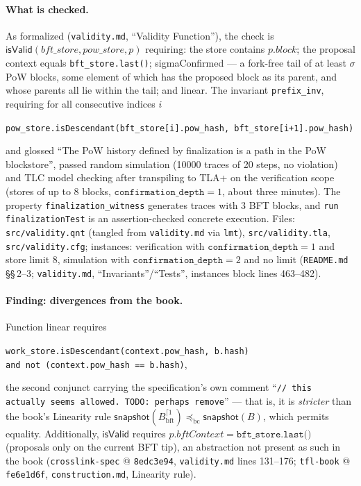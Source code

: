 \documentclass[11pt,a4paper]{article}
\theoremstyle{definition}
\begin{document}
\paragraph{What is checked.} As formalized
(\texttt{validity.md}, ``Validity Function''), the check is
$\mathsf{isValid}(\mathit{bft\_store}, \mathit{pow\_store}, p)$ requiring:
the store contains $p.\mathit{block}$; the proposal context equals
\texttt{bft\_store.last()}; \textsf{sigmaConfirmed} --- a fork-free tail
of at least $\sigma$ PoW blocks, some element of which has the proposed
block as its parent, and whose parents all lie within the tail; and
\textsf{linear}. The
invariant \texttt{prefix\_inv}, requiring for all consecutive indices $i$
\begin{center}
\texttt{pow\_store.isDescendant(bft\_store[i].pow\_hash,
bft\_store[i+1].pow\_hash)}
\end{center}
and glossed ``The PoW history defined by finalization is a path in the
PoW blockstore'', passed random
simulation (10000 traces of 20 steps, no violation) and TLC model
checking after transpiling to TLA+ on the verification scope (stores of
up to 8 blocks, $\mathtt{confirmation\_depth} = 1$, about three minutes).
The property \texttt{finalization\_witness} generates traces with 3 BFT
blocks, and \texttt{run finalizationTest} is an assertion-checked
concrete execution. Files: \texttt{src/validity.qnt} (tangled from
\texttt{validity.md} via \texttt{lmt}), \texttt{src/validity.tla},
\texttt{src/validity.cfg}; instances: verification with
$\mathtt{confirmation\_depth} = 1$ and store limit 8, simulation with
$\mathtt{confirmation\_depth} = 2$ and no limit (\texttt{README.md}
\S\S\,2--3; \texttt{validity.md}, ``Invariants''/``Tests'', instances
block lines 463--482).

\paragraph{Finding: divergences from the book.} Function \textsf{linear}
requires
\begin{center}
\texttt{work\_store.isDescendant(context.pow\_hash, b.hash)}\\
\texttt{and not (context.pow\_hash == b.hash)},
\end{center}
the second conjunct carrying the specification's own comment
``\texttt{//~this actually seems allowed. TODO: perhaps remove}'' ---
that is, it is \emph{stricter} than the book's Linearity
rule $\mathsf{snapshot}(B^{\lceil 1}_{\mathrm{bft}})
\preceq_{\mathrm{bc}} \mathsf{snapshot}(B)$, which permits equality.
Additionally, $\mathsf{isValid}$ requires
$p.\mathit{bftContext} = \texttt{bft\_store.last()}$ (proposals only on
the current BFT tip), an abstraction not present as such in the book
(\texttt{crosslink-spec} @ \texttt{8edc3e94}, \texttt{validity.md} lines
131--176; \texttt{tfl-book} @ \texttt{fe6e1d6f},
\texttt{construction.md}, Linearity rule).
\end{document}
